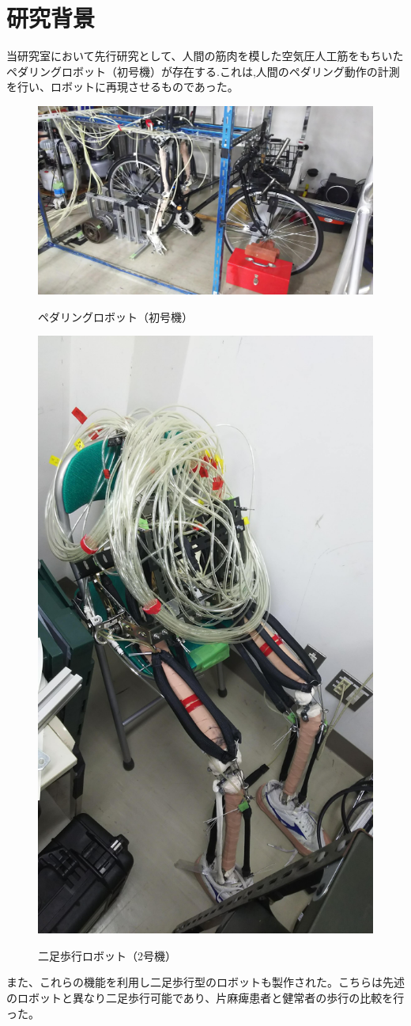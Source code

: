 \section{研究背景}
当研究室において先行研究として、人間の筋肉を模した空気圧人工筋をもちいたペダリングロボット（初号機）が存在する.これは,人間のペダリング動作の計測を行い、ロボットに再現させるものであった。
\begin{figure}
 \begin{center}
  \includegraphics[width=0.5\columnwidth,clip]{Photo/BackGround/1st.eps}
  \caption{ペダリングロボット（初号機）}
  \label{初号機}
  \includegraphics[width=0.5\columnwidth,clip]{Photo/BackGround/2nd.eps}
  \caption{二足歩行ロボット（2号機）}
  \label{2号機}
 \end{center}
\end{figure}

また、これらの機能を利用し二足歩行型のロボットも製作された。こちらは先述のロボットと異なり二足歩行可能であり、片麻痺患者と健常者の歩行の比較を行った。


